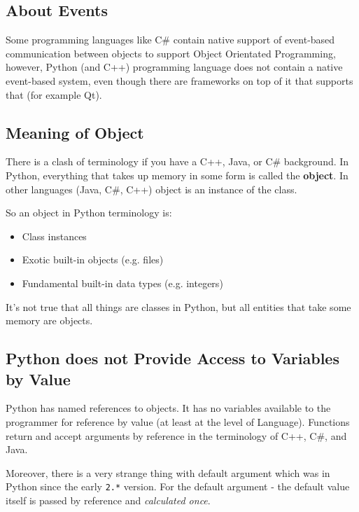 \documentclass[
]{article}
\begin{document}
\hypertarget{about-events}{%
\subsection{About Events}\label{about-events}}

Some programming languages like C\# contain native support of
event-based communication between objects to support Object Orientated
Programming, however, Python (and C++) programming language does not
contain a native event-based system, even though there are frameworks on
top of it that supports that (for example Qt).

\hypertarget{meaning-of-object}{%
\subsection{Meaning of Object}\label{meaning-of-object}}

There is a clash of terminology if you have a C++, Java, or C\#
background. In Python, everything that takes up memory in some form is
called the \textbf{object}. In other languages (Java, C\#, C++) object
is an instance of the class.

So an object in Python terminology is:

\begin{itemize}
\item
  Class instances
\item
  Exotic built-in objects (e.g. files)
\item
  Fundamental built-in data types (e.g. integers)
\end{itemize}

It's not true that all things are classes in Python, but all entities
that take some memory are objects.

\hypertarget{python-does-not-provide-access-to-variables-by-value}{%
\subsection{Python does not Provide Access to Variables by
Value}\label{python-does-not-provide-access-to-variables-by-value}}

Python has named references to objects. It has no variables available to
the programmer for reference by value (at least at the level of
Language). Functions return and accept arguments by reference in the
terminology of C++, C\#, and Java.

Moreover, there is a very strange thing with default argument which was
in Python since the early \texttt{2.*} version. For the default argument
- the default value itself is passed by reference and \emph{calculated
once}.
\end{document}
